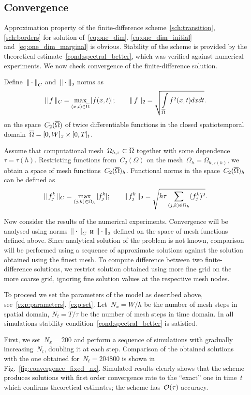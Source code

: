 \subsection{Convergence}

Approximation property of the finite-difference scheme~\eqref{sch:transition},
\eqref{sch:borders} for solution of~\eqref{eq:one_dim},
\eqref{eq:one_dim_initial} and~\eqref{eq:one_dim_marginal} is obvious.
Stability of the scheme is provided by the theoretical
estimate~\eqref{cond:spectral_better}, which was
verified against numerical experiments.
We now check convergence of the finite-difference solution.

Define~${\| \cdot \|}_C$ and~${\| \cdot \|}_2$ norms as
$$\| \, f \, \|_C = \max \limits_{(x, t) \in {\overline{\Omega}}} |f(x, t)|; \qquad \| \, f \, \|_2 = \sqrt{\int \limits_{{\overline{\Omega}}} f^2(x, t) dx dt} {\text{.}}$$
on the space~$C_2({\overline{\Omega}})$ of twice differentiable functions in the
closed spatiotemporal domain~${\overline{\Omega}} = [0, W]_x \times [0, T]_t$.

Assume that computational mesh~$\Omega_{h, \tau} \subset {\overline{\Omega}}$
together with some dependence~$\tau = \tau(h)$.
Restricting functions from~$C_2(\Omega)$ on the mesh~$\Omega_h =
\Omega_{h, \tau(h)}$, we obtain a space of mesh functions~$C_2({\overline{\Omega}})_h$.
Functional norms in the space~$C_2({\overline{\Omega}})_h$ can be defined as
$$\| \, f_j^k \, \|_C = \max \limits_{(j, k) \in \Omega_h} |f_j^k|; \qquad \| \, f_j^k \, \|_2 = \sqrt{h \tau \sum \limits_{(j, k) \in \Omega_h} (f_j^k)^2} {\text{.}}$$

Now consider the results of the numerical experiments.
Convergence will be analysed using norms~${\| \cdot \|}_C$ и ${\| \cdot \|}_2$
defined on the space of mesh functions defined above.
Since analytical solution of the problem is not known, 
comparison will be performed using a sequence of approximate
solutions
against the solution obtained using the finest
mesh. To compute difference between two finite-difference solutions,
we restrict solution obtained using more fine grid on the more coarse
grid,
ignoring fine solution values at the respective mesh nodes.

To proceed we set the parameters of the model as described above,
see~\eqref{exp:parameters}, \eqref{exp:set}.
Let~$N_x = W / h$ be the number of mesh steps in spatial domain,
$N_t = T / \tau$ be the number of mesh steps in time domain.
In all simulations stability condition~\eqref{cond:spectral_better} is
satisfied.

First, we set~$N_x = 200$ and perform a sequence  of simulations with
gradually increasing~$N_t$, doubling it at each step.
Comparison of the obtained solutions with the one obtained for~$N_t =
204800$ is shown in Fig.~\ref{fig:convergence_fixed_nx}.
Simulated results clearly shows that the scheme produces solutions
with first order convergence rate to the ``exact'' one in time~$t$ which
confirms theoretical estimates; the scheme has~${\mathcal{O}} (\tau)$ accuracy.

